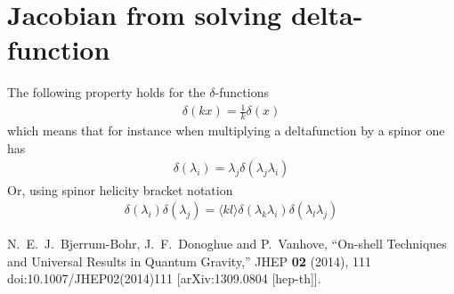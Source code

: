 \documentclass[letter,11pt]{article}
\newcommand{\ab}[1]{\langle #1 \rangle}
\begin{document}
\section{Jacobian from solving delta-function}
The following property holds for the $\delta$-functions
\begin{equation}
	\begin{aligned}
		\delta(kx)=\frac{1}{k}\delta(x)
	\end{aligned}
\end{equation}
which means that for instance when multiplying a deltafunction by a spinor one has
\begin{equation}
	\begin{aligned}
		\delta(\lambda_i)=\lambda_j\delta(\lambda_j\lambda_i)
	\end{aligned}
\end{equation}
Or, using spinor helicity bracket notation
\begin{equation}
	\begin{aligned}
		\delta(\lambda_i)\delta(\lambda_j)=\ab{kl}\delta(\lambda_k\lambda_i)\delta(\lambda_l\lambda_j)
	\end{aligned}
\end{equation}
\begin{thebibliography}{99}
N.~E.~J.~Bjerrum-Bohr, J.~F.~Donoghue and P.~Vanhove,
``On-shell Techniques and Universal Results in Quantum Gravity,''
JHEP \textbf{02} (2014), 111
doi:10.1007/JHEP02(2014)111
[arXiv:1309.0804 [hep-th]].

\end{thebibliography}
\end{document}
